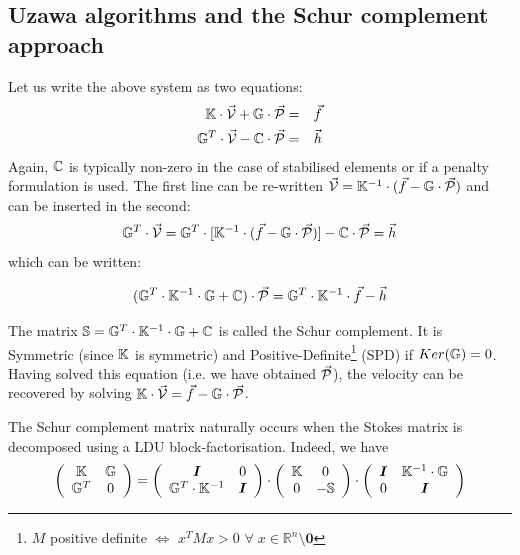\subsection{Uzawa algorithms and the Schur complement approach }


Let us write the above system as two equations:
\begin{eqnarray}
{\mathbb{K}} \cdot \vec{\cal V} + {\mathbb{G}} \cdot \vec{\cal P} &=& \vec{f} \nonumber\\
{\mathbb{G}}^T \cdot  \vec{\cal V} - {\mathbb{C}} \cdot \vec{\cal P} &=& \vec{h} \nonumber
\end{eqnarray}
Again, ${\mathbb{C}}$ is typically non-zero in the case of stabilised elements or if a 
penalty formulation is used. 
The first line can be re-written 
$\vec{\cal V}={\mathbb{K}}^{-1}\cdot (\vec{f} - {\mathbb{G}} \cdot \vec{\cal P})$ and can be inserted in the second:
\begin{equation}
{\mathbb{G}}^T\cdot \vec{\cal V} ={\mathbb{G}}^T \cdot  [ {\mathbb{K}}^{-1} \cdot  (\vec{f} - {\mathbb{G}} \cdot  \vec{\cal P}) ] - {\mathbb{C}}\cdot \vec{\cal P} = \vec{h} 
\end{equation}
which can be written: 
\begin{mdframed}[backgroundcolor=blue!5]
\begin{equation}
({\mathbb{G}}^T \cdot {\mathbb{K}}^{-1} \cdot {\mathbb{G}} + {\mathbb{C}}) \cdot \vec{\cal P} = {\mathbb{G}}^T \cdot {\mathbb{K}}^{-1}\cdot \vec{f} - \vec{h} 
\end{equation}
\end{mdframed}
The matrix ${\mathbb{S}}= {\mathbb{G}}^T \cdot {\mathbb{K}}^{-1} \cdot {\mathbb{G}} + {\mathbb{C}}$ is called the Schur complement. 
It is Symmetric (since ${\mathbb{K}}$ is symmetric) and  Positive-Definite\footnote{$M$ 
positive definite $\iff$ $x^TMx>0$ $\forall \; x\in \mathbb{R}^n \setminus {\bm 0}$ }
(SPD)  if $Ker({{\mathbb{G}}})=0$. 
Having solved this equation (i.e. we have obtained $\vec{\cal P}$), the velocity can be recovered by solving 
${\mathbb{K}}\cdot \vec{\cal V} =\vec{f}- {\mathbb{G}} \cdot \vec{\cal P}$. 

\begin{remark}
The Schur complement matrix naturally occurs when the Stokes matrix is decomposed using 
a LDU block-factorisation. Indeed, we have 
\[
\left(
\begin{array}{cc}
{\mathbb{K}} & {\mathbb{G}} \\ 
{\mathbb{G}}^T & 0
\end{array}
\right)
=
\left(
\begin{array}{cc}
{\bm I} & 0 \\ 
{\mathbb{G}}^T \cdot {\mathbb{K}}^{-1} & {\bm I}
\end{array}
\right)
\cdot
\left(
\begin{array}{cc}
{\mathbb{K}} & 0 \\ 
0 & -{\mathbb{S}}
\end{array}
\right)
\cdot
\left(
\begin{array}{cc}
{\bm I} & {\mathbb{K}}^{-1} \cdot {\mathbb{G}} \\ 
0 & {\bm I}
\end{array}
\right)
\]
\end{remark}

